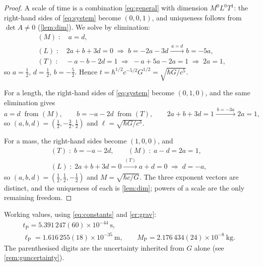 \documentclass[11pt]{amsbook}
\theoremstyle{plain}
\theoremstyle{definition}
\theoremstyle{remark}
\begin{document}
\begin{proof}
A scale of time is a combination \cref{eq:general} with dimension $M^{0}L^{0}T^{1}$: the right-hand sides of \cref{eq:system} become $(0, 0, 1)$, and uniqueness follows from $\det A \neq 0$ (\cref{lem:dim}). We solve by elimination:
\begin{equation}\label{eq:solvet}
\begin{aligned}
&(M)\;:\quad a = d,\\
&(L)\;:\quad 2a + b + 3d = 0 \;\Longrightarrow\; b = -2a - 3d \xrightarrow{\ a=d\ } b = -5a,\\
&(T)\;:\quad -a - b - 2d = 1 \;\Longrightarrow\; -a + 5a - 2a = 1 \;\Longrightarrow\; 2a = 1,
\end{aligned}
\end{equation}
so $a = \tfrac12$, $d = \tfrac12$, $b = -\tfrac52$.
Hence $t = \hbar^{1/2} c^{-5/2} G^{1/2} = \sqrt{\hbar G / c^{5}}$.

For a length, the right-hand sides of \cref{eq:system} become $(0, 1, 0)$, and the same elimination gives
\begin{equation}\label{eq:solvel}
a = d \;\;\text{from } (M),\qquad
b = -a - 2d \;\;\text{from } (T),\qquad
2a + b + 3d = 1 \xrightarrow{\ b=-3a\ } 2a = 1,
\end{equation}
so $(a, b, d) = (\tfrac12, -\tfrac32, \tfrac12)$ and $\ell = \sqrt{\hbar G / c^{3}}$.

For a mass, the right-hand sides become $(1, 0, 0)$, and
\begin{equation}\label{eq:solvem}
\begin{gathered}
(T)\;:\; b = -a - 2d,\qquad
(M)\;:\; a - d = 2a = 1,\\
(L)\;:\; 2a + b + 3d = 0 \xrightarrow{\ (T)\ } a + d = 0 \;\Longrightarrow\; d = -a,
\end{gathered}
\end{equation}
so $(a, b, d) = (\tfrac12, \tfrac12, -\tfrac12)$ and $M = \sqrt{\hbar c / G}$. The three exponent vectors are distinct, and the uniqueness of each is \cref{lem:dim}; powers of a scale are the only remaining freedom.
\end{proof}

Working values, using \cref{eq:constants} and \cref{er:grav}:
\begin{equation}\label{eq:values}
\begin{gathered}
t_{\mathrm P} = 5.391\,247(60) \times 10^{-44}\ \mathrm{s},\\
\ell_{\mathrm P} = 1.616\,255(18) \times 10^{-35}\ \mathrm{m},\qquad
M_{\mathrm P} = 2.176\,434(24) \times 10^{-8}\ \mathrm{kg}.
\end{gathered}
\end{equation}
The parenthesised digits are the uncertainty inherited from $G$ alone (see \cref{rem:guncertainty}).
\end{document}
